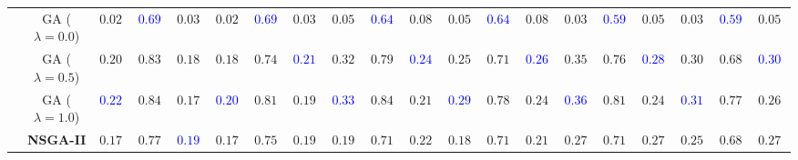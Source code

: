 \begin{table}[t]
{\begin{tabular}{cc|cccccc|cccccc|cccccc}
& GA ($\lambda=0.0$)
& $0.0200$ & \textbf{\textcolor{blue}{$0.6982$}} & $0.0375$ & $0.0200$ & \textbf{\textcolor{blue}{$0.6982$}} & $0.0375$ & $0.0500$ & \textbf{\textcolor{blue}{$0.6439$}} & $0.0877$ & $0.0500$ & \textbf{\textcolor{blue}{$0.6439$}} & $0.0877$ & $0.0300$ & \textbf{\textcolor{blue}{$0.5992$}} & $0.0558$ & $0.0300$ & \textbf{\textcolor{blue}{$0.5992$}} & $0.0558$ \\
& GA ($\lambda=0.5$)
& $0.2000$ & $0.8319$ & $0.1827$ & $0.1800$ & $0.7414$ & \textbf{\textcolor{blue}{$0.2123$}} & $0.3200$ & $0.7957$ & \textbf{\textcolor{blue}{$0.2494$}} & $0.2500$ & $0.7121$ & \textbf{\textcolor{blue}{$0.2676$}} & $0.3500$ & $0.7667$ & \textbf{\textcolor{blue}{$0.2800$}} & $0.3000$ & $0.6821$ & \textbf{\textcolor{blue}{$0.3087$}} \\
& GA ($\lambda=1.0$)
& \textbf{\textcolor{blue}{$0.2200$}} & $0.8497$ & $0.1786$ & \textbf{\textcolor{blue}{$0.2000$}} & $0.8168$ & $0.1912$ & \textbf{\textcolor{blue}{$0.3300$}} & $0.8420$ & $0.2137$ & \textbf{\textcolor{blue}{$0.2900$}} & $0.7806$ & $0.2498$ & \textbf{\textcolor{blue}{$0.3600$}} & $0.8110$ & $0.2479$ & \textbf{\textcolor{blue}{$0.3100$}} & $0.7758$ & $0.2602$ \\
& \textbf{NSGA-II}
& $0.1700$ & $0.7726$ & \textbf{\textcolor{blue}{$0.1945$}} & $0.1700$ & $0.7574$ & $0.1999$ & $0.1900$ & $0.7145$ & $0.2281$ & $0.1800$ & $0.7190$ & $0.2194$ & $0.2700$ & $0.7142$ & $0.2777$ & $0.2500$ & $0.6821$ & $0.2799$ \\

\bottomrule
\end{tabular}
}
\end{table}


\clearpage

